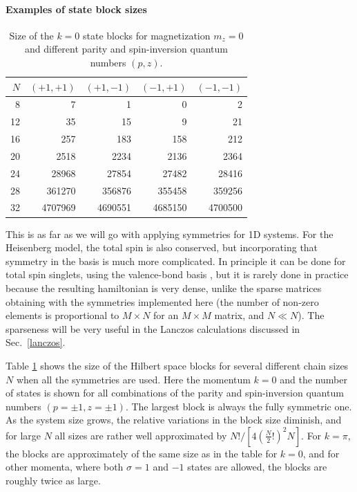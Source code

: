 \documentclass[draft,numberedheadings]{aipproc}
\begin{document}
\paragraph{Examples of state block sizes}

\begin{table}
\begin{tabular}{rrrrr}
\hline
$N$ & $(+1,+1)$ & $(+1,-1)$ & $(-1,+1)$ & $(-1,-1)$ \\
\hline
 8 & 7 & 1 & 0 & 2 \\
12 & 35 & 15 & 9 & 21 \\
16 & 257 & 183 & 158 & 212 \\
20 & 2518 & 2234 & 2136 & 2364 \\
24 & 28968 & 27854 & 27482 & 28416 \\
28 & 361270 & 356876 & 355458 & 359256 \\
32 & 4707969 & 4690551 & 4685150 & 4700500 \\
\hline
\end{tabular}
\label{sizetab}
\caption{Size of the $k=0$ state blocks for magnetization $m_z=0$ and different parity and spin-inversion 
quantum numbers $(p,z)$.}
\end{table}

This is as far as we will go with applying symmetries for 1D systems. For the Heisenberg model, the total spin is also conserved, but incorporating 
that symmetry in the basis is much more complicated. In principle it can be done for total spin singlets, using the valence-bond basis \cite{poilblanc}, 
but it is rarely done in practice because the resulting hamiltonian is very dense, unlike the sparse matrices obtaining with the symmetries 
implemented here (the number of non-zero elements is proportional to $M\times N$ for an $M\times M$ matrix, and $N\ll N$). The sparseness 
will be very useful in the Lanczos calculations discussed in Sec.~\ref{lanczos}.

Table \ref{sizetab} shows the size of the Hilbert space blocks for several different chain sizes $N$ when all the symmetries are used. Here the momentum 
$k=0$ and the number of states is shown for all combinations of the parity and spin-inversion quantum numbers $(p=\pm 1,z=\pm 1)$. The largest block is always 
the fully symmetric one. As the system size grows, the 
relative variations in the block size diminish, and for large $N$ all sizes are rather well approximated by $N!/[4(\frac{N}{2}!)^2N]$. For $k=\pi$,
the blocks are approximately of the same size as in the table for $k=0$, and for other momenta, where both $\sigma=1$ and $-1$ states are allowed, 
the blocks are roughly twice as large.
\end{document}

